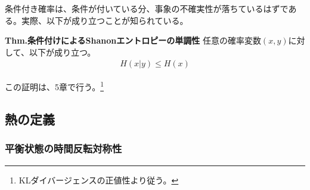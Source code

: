 \documentclass[a4paper,11pt]{jsarticle}
\numberwithin{equation}{section}
\begin{document}
条件付き確率は、条件が付いている分、事象の不確実性が落ちているはずである。実際、以下が成り立つことが知られている。
\begin{itembox}[l]{\textbf{Thm.条件付けによるShanonエントロピーの単調性}}
    任意の確率変数$(x,y)$に対して、以下が成り立つ。 
    \begin{align}
        H(x|y) \leq H(x)
    \end{align}
\end{itembox}
この証明は、5章で行う。\footnote{KLダイバージェンスの正値性より従う。}\\

\subsection{熱の定義}
\subsubsection{平衡状態の時間反転対称性}
\end{document}
